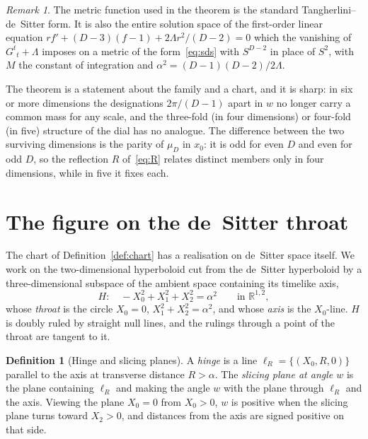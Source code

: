\documentclass[11pt]{article}
\theoremstyle{plain}
\theoremstyle{definition}
\newtheorem{definition}[theorem]{Definition}
\theoremstyle{remark}
\newtheorem{remark}[theorem]{Remark}
\begin{document}
\begin{remark}
The metric function used in the theorem is the standard Tangherlini--de~Sitter form. It is also the entire
solution space of the first-order linear equation $rf'+(D-3)(f-1)+2\Lambda r^{2}/(D-2)=0$ which the vanishing of
$G^{t}{}_{t}+\Lambda$ imposes on a metric of the form~\eqref{eq:sds} with $S^{D-2}$ in place of $S^{2}$, with $M$
the constant of integration and $\alpha^{2}=(D-1)(D-2)/2\Lambda$.
\end{remark}

The theorem is a statement about the family and a chart, and it is sharp: in six or more dimensions the
designations $2\pi/(D-1)$ apart in $w$ no longer carry a common mass for any scale, and the three-fold (in four
dimensions) or four-fold (in five) structure of the dial has no analogue. The difference between the two
surviving dimensions is the parity of $\mu_{D}$ in $x_{0}$: it is odd for even $D$ and even for odd $D$, so the
reflection $R$ of~\eqref{eq:R} relates distinct members only in four dimensions, while in five it fixes each.

\section{The figure on the de~Sitter throat}\label{sec:figure}

The chart of Definition~\ref{def:chart} has a realisation on de~Sitter space itself. We work on the
two-dimensional hyperboloid cut from the de~Sitter hyperboloid by a three-dimensional subspace of the ambient
space containing its timelike axis,
\begin{equation}\label{eq:hyperboloid}
H:\quad -X_{0}^{2}+X_{1}^{2}+X_{2}^{2}=\alpha^{2}\qquad\text{in }\mathbb{R}^{1,2},
\end{equation}
whose \emph{throat} is the circle $X_{0}=0$, $X_{1}^{2}+X_{2}^{2}=\alpha^{2}$, and whose \emph{axis} is the $X_{0}$-line.
$H$ is doubly ruled by straight null lines, and the rulings through a point of the throat are tangent to it.

\begin{definition}[Hinge and slicing planes]\label{def:hinge}
A \emph{hinge} is a line $\ell_{R}=\{(X_{0},R,0)\}$ parallel to the axis at transverse distance $R>\alpha$. The
\emph{slicing plane at angle $w$} is the plane containing $\ell_{R}$ and making the angle $w$ with the plane
through $\ell_{R}$ and the axis. Viewing the plane $X_{0}=0$ from $X_{0}>0$, $w$ is positive when the slicing plane
turns toward $X_{2}>0$, and distances from the axis are signed positive on that side.
\end{definition}
\end{document}
